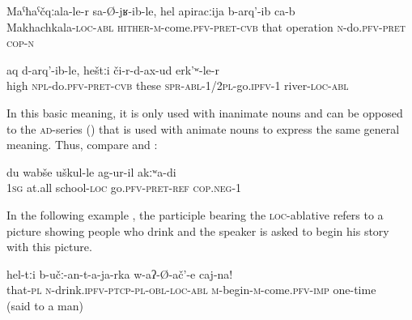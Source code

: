 \begin{exe}
	\ex	\label{ex:He came back from Makhachkala and had the operation}
	\gll	Maˁħaˁčqːala-le-r	sa-Ø-jʁ-ib-le,	hel	apiracːija	b-arq'-ib ca-b\\
		Makhachkala-\textsc{loc}-\textsc{abl}	\textsc{hither-m}-come.\textsc{pfv}-\textsc{pret}-\textsc{cvb} that operation	\textsc{n}-do.\textsc{pfv}-\textsc{pret} \textsc{cop-n}\\
	\glt	{}

	\ex	\label{ex:We take up (the trousers) and go across the river}
	\gll	aq	d-arq'-ib-le,	heštːi	či-r-d-ax-ud	erk'ʷ-le-r\\
		high	\textsc{npl}-do.\textsc{pfv}-\textsc{pret}-\textsc{cvb}	these	\textsc{spr}-\textsc{abl}-1/2\textsc{pl}-go.\textsc{ipfv}-1	river-\textsc{loc}-\textsc{abl}\\
	\glt	{}
\end{exe}


In this basic meaning, it is only used with inanimate nouns and can be opposed to the \textsc{ad}-series () that is used with animate nouns to express the same general meaning. Thus, compare  and :
%
\begin{exe}
	\ex	\label{ex:I did not go to school at all}
	\gll	du	wabše	uškul-le	ag-ur-il	akːʷa-di \\
		1\textsc{sg}	at.all	school-\textsc{loc}	go.\textsc{pfv}-\textsc{pret}-\textsc{ref}	\textsc{cop.neg}-1\\
	\glt	{}
\end{exe}

In the following example , the participle bearing the \textsc{loc-}ablative refers to a picture showing people who drink and the speaker is asked to begin his story with this picture.
%
\begin{exe}
	\ex	\label{ex:First begin with these who drink}
	\gll	hel-tːi	b-učː-an-t-a-ja-rka	w-aʔ-Ø-ač'-e	caj-na! \\
		that-\textsc{pl}	\textsc{n}-drink.\textsc{ipfv}-\textsc{ptcp}-\textsc{pl}-\textsc{obl}-\textsc{loc}-\textsc{abl}	\textsc{m}-begin-\textsc{m}-come.\textsc{pfv}-\textsc{imp} one-time\\
	\glt	{} (said to a man)
\end{exe}

